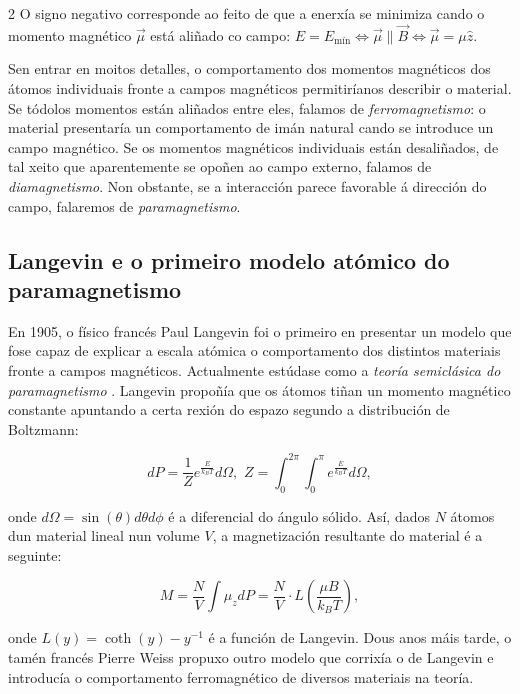\begin{multicols}{2}
O signo negativo corresponde ao feito de que a enerxía se minimiza cando o
momento magnético $\vec \mu$ está aliñado co campo: $E=E_\mathrm{mín}
\Leftrightarrow \vec \mu \parallel \vec B \Leftrightarrow \vec \mu=\mu \hat z$.

Sen entrar en moitos detalles, o comportamento dos momentos magnéticos dos
átomos individuais fronte a campos magnéticos permitiríanos describir o
material. Se tódolos momentos están aliñados entre eles, falamos de
\emph{ferromagnetismo}: o material presentaría un comportamento de imán natural
cando se introduce un campo magnético. Se os momentos magnéticos individuais
están desaliñados, de tal xeito que aparentemente se opoñen ao campo externo,
falamos de \emph{diamagnetismo}. Non obstante, se a interacción parece favorable
á dirección do campo, falaremos de \emph{paramagnetismo}.

\subsection*{Langevin e o primeiro modelo atómico do paramagnetismo}

En 1905, o físico francés Paul Langevin foi o primeiro en presentar un modelo
que fose capaz de explicar a escala atómica o comportamento dos distintos
materiais fronte a campos magnéticos. Actualmente estúdase como a \emph{teoría
semiclásica do paramagnetismo} \cite[Sec. 2.1.4.]{blundell.s_2001}. Langevin
propoñía que os átomos tiñan un momento magnético constante apuntando a certa
rexión do espazo segundo a distribución de Boltzmann:

\begin{equation}\label{ec.: bvl_boltzmann}
    dP = \frac{1}{Z}e^{\frac{E}{k_B T}}d\Omega,\,\, Z
    =\int_{0}^{2\pi}\int_{0}^{\pi}e^{\frac{E}{k_B T}}d\Omega,
\end{equation}

onde $d\Omega = \sin(\theta)d\theta d\phi$ é a diferencial do ángulo sólido.
Así, dados $N$ átomos dun material lineal nun volume $V$, a magnetización
resultante do material é a seguinte:

\begin{equation}\label{ec.: blv_langevin}
    M = \frac{N}{V} \int\mu_zdP = \frac{N}{V}\cdot
    L\left(\frac{\mu B}{k_B T}\right),
\end{equation}

onde $L(y) = \coth(y)-y^{-1}$ é a función de Langevin. Dous anos máis tarde, o
tamén francés Pierre Weiss propuxo outro modelo que corrixía o de Langevin e
introducía o comportamento ferromagnético de diversos materiais na teoría.


\end{multicols}
